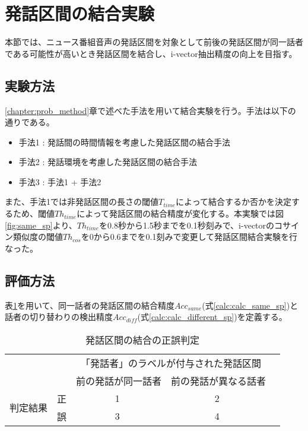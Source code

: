 \section{発話区間の結合実験}
\label{chapter:connect_sp}
本節では、ニュース番組音声の発話区間を対象として前後の発話区間が同一話者である可能性が高いとき発話区間を結合し、i-vector抽出精度の向上を目指す。

\subsection{実験方法}
\ref{chapter:prob_method}章で述べた手法を用いて結合実験を行う。手法は以下の通りである。

\begin{itemize}
\item 手法1 : 発話間の時間情報を考慮した発話区間の結合手法
\item 手法2 : 発話環境を考慮した発話区間の結合手法
\item 手法3 : 手法1 + 手法2
\end{itemize}\par\par

また、手法1では非発話区間の長さの閾値$T_{time}$によって結合するか否かを決定するため、閾値$Th_{time}$によって発話区間の結合精度が変化する。本実験では図\ref{fig:same_sp}より、$Th_{time}$を0.8秒から1.5秒までを0.1秒刻みで、i-vectorのコサイン類似度の閾値$Th_{cos}$を0から0.6までを0.1刻みで変更して発話区間結合実験を行なった。

\subsection{評価方法}
表\ref{table:connect_calc}を用いて、同一話者の発話区間の結合精度$Acc_{same}$(式\ref{calc:calc_same_sp})と話者の切り替わりの検出精度$Acc_{diff}$(式\ref{calc:calc_different_sp})を定義する。

\begin{table}[H]
\begin{center}
    \caption{発話区間の結合の正誤判定 \label{table:connect_calc}}
\begin{tabular}{|c|c|c|c|l}
\cline{1-4}
\multicolumn{2}{|c|}{\multirow{2}{*}{}} & \multicolumn{2}{c|}{「発話者」のラベルが付与された発話区間} &  \\ \cline{3-4}
\multicolumn{2}{|c|}{}                  & 前の発話が同一話者        & 前の発話が異なる話者        &  \\ \cline{1-4}
\multirow{2}{*}{判定結果}        & 正        & \textcircled{\scriptsize 1}                  & \textcircled{\scriptsize 2}                   &  \\ \cline{2-4}
& 誤        & \textcircled{\scriptsize 3}                  & \textcircled{\scriptsize 4}                   &  \\ \cline{1-4}
\end{tabular}
\end{center}
\end{table}

